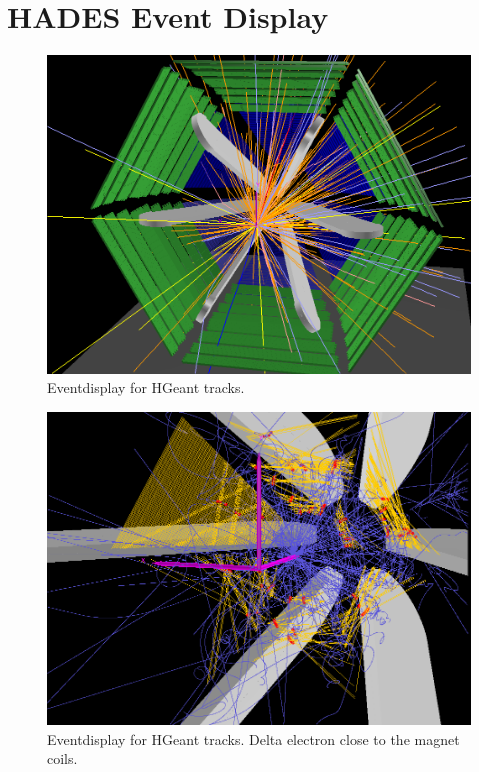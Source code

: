 \chapter{HADES Event Display}\label{Chapter_eventdisplay}


\begin{figure}[\htb]
\begin{center}
\includegraphics[width=0.8\linewidth,clip=true]{pics/eventdisplay/hades_au17au_sim_geant_iso_dark.png}
\caption[Eventdisplay for HGeant tracks]{Eventdisplay for HGeant tracks.} \label{eventdisplay_geant}
\end{center}
\end{figure}

\begin{figure}[\htb]
\begin{center}
\includegraphics[width=0.8\linewidth,clip=true]{pics/eventdisplay/evt51_deltaelectrons_wires.png}
\caption[Eventdisplay for HGeant tracks]{Eventdisplay for HGeant tracks. Delta electron close
to the magnet coils.} \label{eventdisplay_deltas_geant}
\end{center}
\end{figure}



